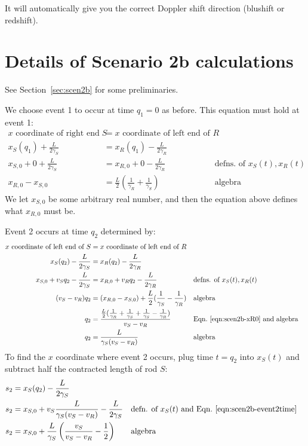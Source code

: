 \documentclass[a4paper]{article}
\theoremstyle{plain}
\theoremstyle{definition}
\begin{document}
It will automatically give you the correct Doppler shift direction
(blushift or redshift).


\section{Details of Scenario 2b calculations}
\label{app:scen2b}

See Section~\ref{sec:scen2b} for some preliminaries.

We choose event 1 to occur at time $q_1=0$ as before.
This equation must hold at event 1:
\begin{align}
\text{$x$ coordinate of right end of $S$} & = \text{$x$ coordinate of left end of $R$} \nonumber \\
x_S(q_1) + \frac{L}{2\gamma_S} & = x_R(q_1) - \frac{L}{2\gamma_R} \nonumber \\
x_{S,0} + 0 + \frac{L}{2\gamma_S} & = x_{R,0} + 0 - \frac{L}{2\gamma_R} & & \text{defns. of $x_S(t), x_R(t)$} \nonumber \\
x_{R,0} - x_{S,0} & = \frac{L}{2} ( \frac{1}{\gamma_R} + \frac{1}{\gamma_S} ) & & \text{algebra} \label{eqn:scen2b-xR0}
\end{align}
We let $x_{S,0}$ be some arbitrary real number, and then the equation
above defines what $x_{R,0}$ must be.

Event 2 occurs at time $q_2$ determined by:
\begin{align}
\text{$x$ coordinate of left end of $S$} & = \text{$x$ coordinate of left end of $R$} \nonumber \\
x_S(q_2) - \frac{L}{2\gamma_S} & = x_R(q_2) - \frac{L}{2\gamma_R} \nonumber \\
x_{S,0} + v_S q_2 - \frac{L}{2\gamma_S} & = x_{R,0} + v_R q_2 - \frac{L}{2\gamma_R} & & \text{defns. of $x_S(t), x_R(t)$} \nonumber \\
(v_S - v_R) q_2 & = (x_{R,0} - x_{S,0}) + \frac{L}{2} ( \frac{1}{\gamma_S} - \frac{1}{\gamma_R} ) & & \text{algebra} \nonumber \\
q_2 & = \frac{ \frac{L}{2} ( \frac{1}{\gamma_R} + \frac{1}{\gamma_S} + \frac{1}{\gamma_S} - \frac{1}{\gamma_R})}{v_S - v_R} & & \text{Eqn.~\eqref{eqn:scen2b-xR0} and algebra} \nonumber \\
q_2 & = \frac{L}{\gamma_S(v_S - v_R)} & & \text{algebra} \label{eqn:scen2b-event2time}
\end{align}
To find the $x$ coordinate where event 2 occurs, plug time $t=q_2$
into $x_S(t)$ and subtract half the contracted length of rod $S$:
\begin{align}
s_2 & = x_S(q_2) - \frac{L}{2\gamma_S} \nonumber \\
s_2 & = x_{S,0} + v_S \frac{L}{\gamma_S(v_S - v_R)} - \frac{L}{2\gamma_S} & & \text{defn. of $x_S(t)$ and Eqn.~\eqref{eqn:scen2b-event2time}} \nonumber \\
s_2 & = x_{S,0} + \frac{L}{\gamma_S} \left( \frac{v_S}{v_S - v_R} - \frac{1}{2} \right) & & \text{algebra} \label{eqn:scen2b-event2xcoord}
\end{align}
\end{document}
